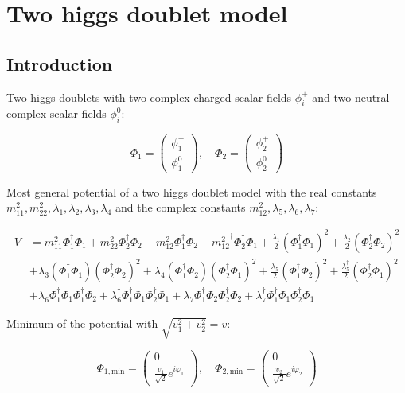 \documentclass[12pt,oneside]{book}
\begin{document}
\chapter*{Two higgs doublet model}

\section*{Introduction}

Two higgs doublets with two complex charged scalar fields $\phi^+_{i}$ and two neutral complex scalar fields $\phi^0_{i}$:

\begin{equation}
    \Phi_1 = \begin{pmatrix} \phi_1^{+} \\ \phi_1^{0} \end{pmatrix}, \quad \Phi_2 = \begin{pmatrix} \phi_2^{+} \\ \phi_2^{0} \end{pmatrix}
\end{equation}

Most general potential of a two higgs doublet model with the real constants $m_{11}^2, m_{22}^2, \lambda_1, \lambda_2, \lambda_3, \lambda_4$ and the complex constants $m_{12}^2, \lambda_5, \lambda_6, \lambda_7$:

\begin{align}
    V &= m_{11}^{2}\Phi_1^{\dagger}\Phi_1 + m_{22}^{2}\Phi_2^{\dagger}\Phi_2 - m_{12}^{2}\Phi_1^{\dagger}\Phi_2 - {m_{12}^2}^{\dagger}\Phi_2^{\dagger}\Phi_1 + \frac{\lambda_1}{2}(\Phi_1^{\dagger}\Phi_1)^2 + \frac{\lambda_2}{2}(\Phi_2^{\dagger}\Phi_2)^2 \\ \nonumber
    &+ \lambda_3(\Phi_1^{\dagger}\Phi_1)(\Phi_2^{\dagger}\Phi_2)^{2} + \lambda_4(\Phi_1^{\dagger}\Phi_2)(\Phi_2^{\dagger}\Phi_1)^{2} + \frac{\lambda_5}{2}(\Phi_1^{\dagger}\Phi_2)^2 + \frac{\lambda^{\dagger}_5}{2}(\Phi_2^{\dagger}\Phi_1)^2 \\ \nonumber
    &+ \lambda_6\Phi_1^{\dagger}\Phi_1\Phi_1^{\dagger}\Phi_2 + \lambda^{\dagger}_6\Phi_1^{\dagger}\Phi_1\Phi_2^{\dagger}\Phi_1 + \lambda_7\Phi_1^{\dagger}\Phi_2\Phi_2^{\dagger}\Phi_2 + \lambda^{\dagger}_7\Phi_1^{\dagger}\Phi_1\Phi_2^{\dagger}\Phi_1
\end{align} 

Minimum of the potential with $\sqrt{v_1^2 + v_2^2} = v$:

\begin{equation}
    \Phi_{1, \text{min}} = \begin{pmatrix} 0 \\ \frac{v_1}{\sqrt{2}}e^{i\varphi_1} \end{pmatrix}, \quad \Phi_{2, \text{min}} = \begin{pmatrix} 0 \\ \frac{v_2}{\sqrt{2}}e^{i\varphi_2} \end{pmatrix}
\end{equation}
\end{document}
